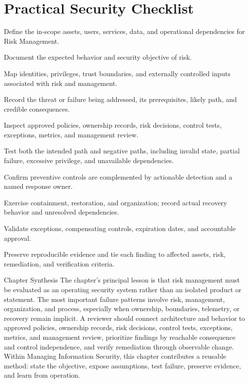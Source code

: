 \documentclass[11pt,letterpaper]{article}
\begin{document}
\section*{Practical Security Checklist}
\begin{CornellChecklist}
\item Define the in-scope assets, users, services, data, and operational dependencies for Risk Management.
\item Document the expected behavior and security objective of risk.
\item Map identities, privileges, trust boundaries, and externally controlled inputs associated with risk and management.
\item Record the threat or failure being addressed, its prerequisites, likely path, and credible consequences.
\item Inspect approved policies, ownership records, risk decisions, control tests, exceptions, metrics, and management review.
\item Test both the intended path and negative paths, including invalid state, partial failure, excessive privilege, and unavailable dependencies.
\item Confirm preventive controls are complemented by actionable detection and a named response owner.
\item Exercise containment, restoration, and organization; record actual recovery behavior and unresolved dependencies.
\item Validate exceptions, compensating controls, expiration dates, and accountable approval.
\item Preserve reproducible evidence and tie each finding to affected assets, risk, remediation, and verification criteria.
\end{CornellChecklist}
\begin{CornellSummaryBox}{Chapter Synthesis}
The chapter's principal lesson is that risk management must be evaluated as an operating security system rather than an isolated product or statement. The most important failure patterns involve risk, management, organization, and process, especially when ownership, boundaries, telemetry, or recovery remain implicit. A reviewer should connect architecture and behavior to approved policies, ownership records, risk decisions, control tests, exceptions, metrics, and management review, prioritize findings by reachable consequence and control independence, and verify remediation through observable change. Within Managing Information Security, this chapter contributes a reusable method: state the objective, expose assumptions, test failure, preserve evidence, and learn from operation.
\end{CornellSummaryBox}
\end{document}
